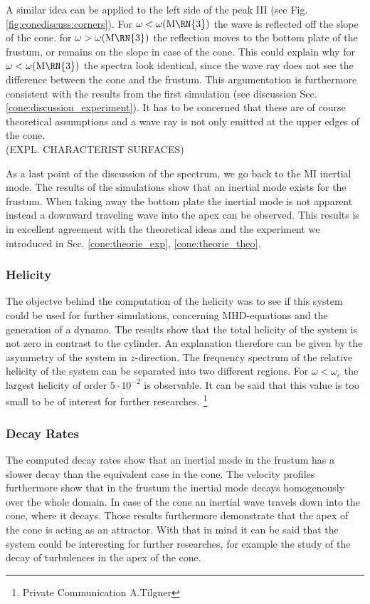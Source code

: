 A similar idea can be applied to the left side of the peak \RN{3} (see Fig. \ref{fig:conediscuss:corners}).
For $\omega<\omega(\text{M\RN{3}})$ the wave is reflected off the slope of the cone.
for  $\omega>\omega(\text{M\RN{3}})$ the reflection moves to the bottom plate of the frustum,
or remains on the slope in case of the cone.
This could explain why for   $\omega<\omega(\text{M\RN{3}})$  the spectra look identical,
since the wave ray does not see the difference between the cone and the frustum.
This argumentation is furthermore consistent with the results from the first simulation
(see discussion Sec. \ref{cone:discussion_experiment}).
It has to be concerned that these are of course theoretical assumptions and a wave ray is not only emitted at the
upper edges of the cone.\\ (EXPL. CHARACTERIST SURFACES)

As a last point of the discussion of the spectrum, we go back to the M\RN{1} inertial mode.
The results of the simulations show that an inertial mode exists for the frustum.
When taking away the bottom plate the inertial mode is not apparent instead
a downward traveling wave into the apex can be observed.
This results is in excellent agreement with the theoretical ideas and the experiment we introduced in Sec.
\ref{cone:theorie_exp}, \ref{cone:theorie_theo}.

\subsubsection{Helicity}

The objectve behind the computation of the helicity was to see if this system could be used
for further simulations, concerning MHD-equations and the generation of a dynamo.
The results show that the total helicity of the system is not zero in contrast to the cylinder.
An explanation therefore can be given by the asymmetry of the system in $z$-direction.
The frequency spectrum of the relative helicity of the  system can be separated into two different regions.
For $\omega<\omega_c$ the largest helicity of order $5\cdot10^{-2}$ is observable.
It can be said that this value is too small to be of interest for further researches.
\footnote{Private Communication A.Tilgner}


\subsubsection{Decay Rates}

The computed decay rates show that an inertial mode in the frustum has a slower decay
than the equivalent case in the cone.
The velocity profiles furthermore show that in the frustum the inertial mode decays homogenously over the whole domain.
In case of the cone an inertial wave travels down into the cone, where it decays.
Those results furthermore demonstrate that the apex of the cone is acting as an attractor.
With that in mind it can be said that the system could be interesting for further researches,
for example the study of the decay of turbulences in the apex of the cone.

